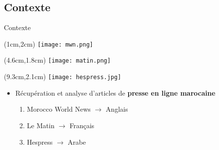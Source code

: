 \documentclass[10pt,sans,usenames,dvipsnames,english,compress]{beamer}
\begin{document}
\subsection{Contexte}
\begin{frame}{Contexte}
        \begin{textblock*}{3cm}(1cm,2cm)
		\texttt{[image: mwn.png]}
	\end{textblock*}

	\begin{textblock*}{3cm}(4.6cm,1.8cm)
		\texttt{[image: matin.png]}
	\end{textblock*}

        \begin{textblock*}{3cm}(9.3cm,2.1cm)
		\texttt{[image: hespress.jpg]}
	\end{textblock*}

        \vspace{1.5cm}

	\begin{itemize}
		\item Récupération et analyse d'articles de \textbf{presse en ligne marocaine}
            \vspace{0.3cm}
            \begin{enumerate}
                \item \normalsize{Morocco World News $\rightarrow$ Anglais}
                \item \normalsize{Le Matin $\rightarrow$ Français}
                \item \normalsize{Hespress $\rightarrow$ Arabe}
            \end{enumerate}
        \end{itemize}
\end{frame}
\end{document}
